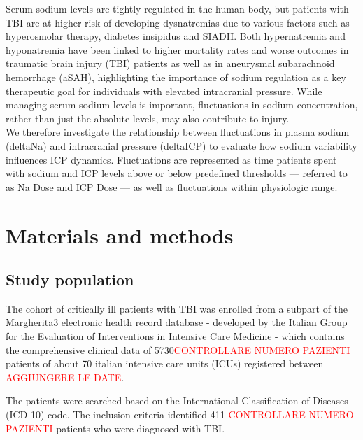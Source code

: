 Serum sodium levels are tightly regulated in the human body, but patients with TBI are at higher risk of developing dysnatremias due to various factors such as hyperosmolar therapy, diabetes insipidus and SIADH. Both hypernatremia\cite{maggioreRelationIncidenceHypernatremia2009a}\cite{vedantamMorbidityMortalityAssociated2017a} and hyponatremia \cite{yumotoPrevalenceRiskFactors2015a} have been linked to higher mortality rates and worse outcomes in traumatic brain injury (TBI) patients as well as in aneurysmal subarachnoid hemorrhage (aSAH)\cite{labibSodiumItsImpact2024}\cite{balesEffectHyponatremiaSodium2016}, highlighting the importance of sodium regulation as a key therapeutic goal for individuals with elevated intracranial pressure. While managing serum sodium levels is important, fluctuations in sodium concentration, rather than just the absolute levels, may also  contribute to injury.\\

We therefore investigate the relationship between fluctuations in plasma sodium (deltaNa) and intracranial pressure (deltaICP) to evaluate how sodium variability influences ICP dynamics. Fluctuations are represented as time patients spent with sodium and ICP levels above or below predefined thresholds — referred to as Na Dose and ICP Dose — as well as  fluctuations within physiologic range.\\

\section {Materials and methods}
\subsection{Study population}
The cohort of critically ill patients with TBI was enrolled from a subpart of the Margherita3 electronic health record database - developed by the Italian Group for the Evaluation of Interventions in Intensive Care Medicine\cite{finazziDataCollectionResearch2018} - which contains the comprehensive clinical data of 5730\textcolor{red}{CONTROLLARE NUMERO PAZIENTI} patients of about 70 italian intensive care units (ICUs) registered between \textcolor{red}{AGGIUNGERE LE DATE}. 

The patients were searched based on the International Classification of Diseases (ICD-10) code. The inclusion criteria identified 411 \textcolor{red}{CONTROLLARE NUMERO PAZIENTI} patients who were diagnosed with TBI.

